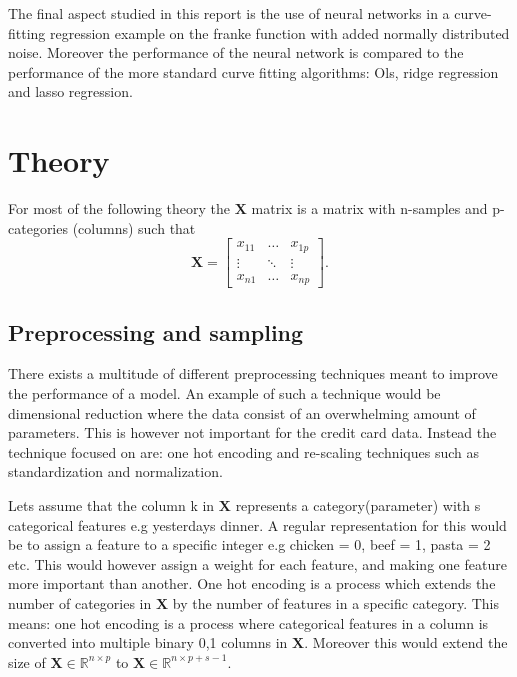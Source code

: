 \documentclass[uio,jmp,amsmath,amssymb,reprint,nofootinbib]{revtex4-1}
\numberwithin{equation}{section}
\begin{document}
The final aspect studied in this report is the use of neural networks in a curve-fitting regression example on the franke function with added normally distributed noise. Moreover the performance of the neural network is compared to the performance of the more standard curve fitting algorithms: Ols, ridge regression and lasso regression. 


\section{Theory}\label{sec:Theory}

For most of the following theory the \(\bm{X}\) matrix is a matrix with n-samples and p-categories (columns) such that
\begin{equation}\label{eq:01}
\bm{X} = \begin{bmatrix} 
    x_{11} & \dots & x_{1p} \\
    \vdots & \ddots & \vdots\\
    x_{n1} & \dots & x_{np} 
    \end{bmatrix}.
\end{equation}

\subsection{Preprocessing and sampling}


There exists a multitude of different preprocessing techniques meant to improve the performance of a model. An example of such a technique would be dimensional reduction where the data consist of an overwhelming amount of parameters. This is however not important for the credit card data. Instead the technique focused on are: one hot encoding and re-scaling techniques such as standardization and normalization.

Lets assume that the column k in \(\bm{X}\) represents a category(parameter) with s categorical features e.g yesterdays dinner. A regular representation for this would be to assign a feature to a specific integer e.g chicken = 0, beef = 1, pasta = 2 etc. This would however assign a weight for each feature, and making one feature more important than another. One hot encoding is a process which extends the number of categories in \(\bm{X}\) by the number of features in a specific category. This means: one hot encoding is a process where categorical features in a column is converted into multiple binary 0,1 columns in \(\bm{X}\). Moreover this would extend the size of \(\bm{X}  \in \mathbb{R}^{n\times p}\) to \(\bm{X}  \in \mathbb{R}^{n\times p + s -1}\).
\end{document}
